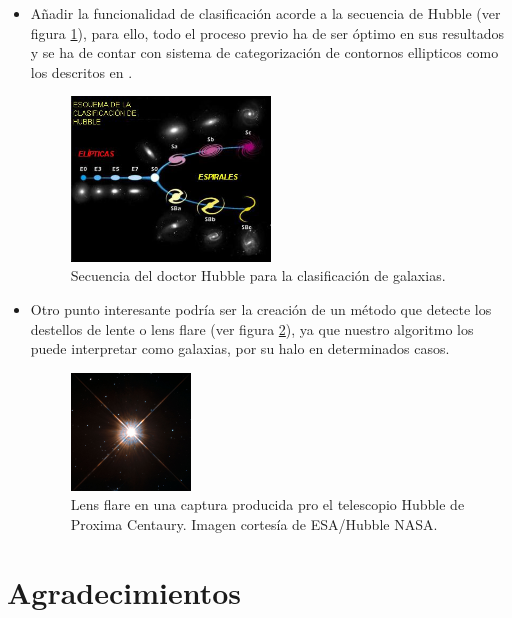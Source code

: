\begin{itemize}
	\item Añadir la funcionalidad de clasificación acorde a la secuencia de Hubble (ver figura \ref{fig:EsquemaHubble}), para ello, todo el proceso previo ha de ser óptimo en sus resultados y se ha de contar con sistema de categorización de contornos ellipticos como los descritos en \cite{JeanPierreElliptical}.
				\begin{figure}[!htb]
					\centering
					\includegraphics[width=0.5\textwidth]{images/EsquemaHubble.jpg}
					\caption{\label{fig:EsquemaHubble}{\small Secuencia del doctor Hubble para la clasificación de galaxias.}}
				\end{figure}
	\item Otro punto interesante podría ser la creación de un método que detecte los destellos de lente o lens flare (ver figura \ref{fig:lensflare}), ya que nuestro algoritmo los puede interpretar como galaxias, por su halo en determinados casos.
			\begin{figure}[!htb]
				\centering
				\includegraphics[width=0.3\textwidth]{images/HubbleProximaCentauri_LENSFLARE}
				\caption{\label{fig:lensflare}Lens flare en una captura producida pro el telescopio Hubble de Proxima Centaury. Imagen cortesía de  ESA/Hubble NASA.}
			\end{figure}
	\end{itemize} 
	
	\newpage
	\section{Agradecimientos}
	
